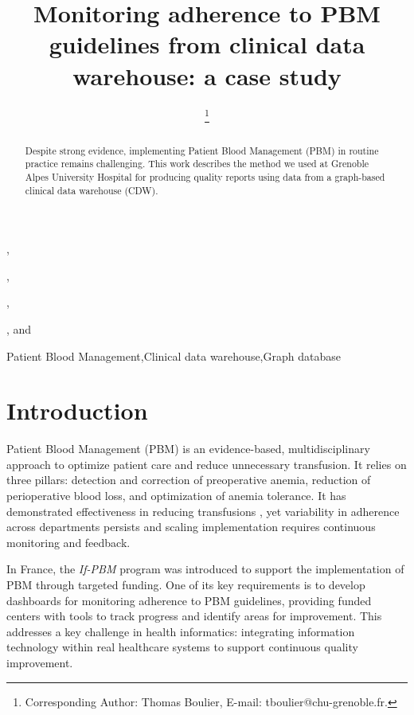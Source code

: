 \documentclass{IOS-Book-Article}
\begin{document}
\pagestyle{headings}
\def\thepage{}
\begin{frontmatter}

\title{Monitoring adherence to PBM guidelines from clinical data warehouse: a case study}

\author[A]{ },
\author[A]{ },
\author[A]{ },
\author[A]{ %
\thanks{Corresponding Author: Thomas Boulier, E-mail: tboulier@chu-grenoble.fr.}}, 
and
\author[A]{ }

\address[A]{Univ. Grenoble Alpes, CNRS, UMR 5525, VetAgro Sup, Grenoble INP, CHU Grenoble Alpes, TIMC, 38000 Grenoble, France}

\begin{abstract}
Despite strong evidence, implementing Patient Blood Management (PBM) in routine practice remains 
challenging. This work describes the method we used at Grenoble Alpes University Hospital for 
producing quality reports using data from a graph-based clinical data warehouse (CDW).
\end{abstract}

\begin{keyword}
Patient Blood Management\sep Clinical data warehouse\sep Graph database
\end{keyword}
\end{frontmatter}

\section{Introduction}

Patient Blood Management (PBM) is an evidence-based, multidisciplinary approach to
optimize patient care and reduce unnecessary transfusion. 
It relies on three pillars: detection and correction of preoperative anemia, reduction 
of perioperative blood loss, and optimization of anemia tolerance. 
It has demonstrated effectiveness in reducing 
transfusions \cite{godonReductionRedBlood2024}, yet variability in adherence across 
departments persists and scaling implementation requires continuous monitoring and feedback.

In France, the \textit{If-PBM} program was introduced to support the implementation of PBM 
through targeted funding.  One of its key requirements is to develop dashboards for monitoring 
adherence to PBM guidelines, providing funded centers with tools to track progress and identify areas
for improvement. This addresses a key challenge in health informatics: integrating information 
technology within real healthcare systems to support continuous quality improvement.
\end{document}
